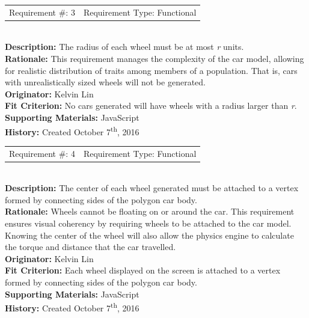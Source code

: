 \documentclass[12pt, titlepage]{article}
\begin{document}
\begin{reqbox}
	\begin{tabular}{cc}
		Requirement \#: 3 & Requirement Type: Functional \\
	\end{tabular} \\
	\textbf{Description:} The radius of each wheel must be at most \textit{r} 
units. 
	\\
	\textbf{Rationale:}  This requirement manages the complexity of the car model, 
	allowing for realistic distribution of traits among members of a population. 
	That is, cars with unrealistically sized wheels will not be generated.\\
	\textbf{Originator:} Kelvin Lin\\
	\textbf{Fit Criterion:} No cars generated will have wheels with a radius larger 
	than \textit{r}.\\
	\textbf{Supporting Materials:} JavaScript \\
	\textbf{History:} Created October 7\textsuperscript{th}, 2016
\end{reqbox}

\newpage

\begin{reqbox}
	\begin{tabular}{cc}
		Requirement \#: 4 & Requirement Type: Functional \\
	\end{tabular} \\
	\textbf{Description:} The center of each wheel generated must be attached to a 
	vertex formed by connecting sides of the polygon car body. \\
	\textbf{Rationale:}  Wheels cannot be floating on or around the car. This 
	requirement ensures visual coherency by requiring wheels to be attached to the 
	car model. Knowing the center of the wheel will also allow the physics engine 
to 
	calculate the torque and distance that the car travelled.\\
	\textbf{Originator:} Kelvin Lin\\
	\textbf{Fit Criterion:} Each wheel displayed on the screen is attached to a 
	vertex formed by connecting sides of the polygon car body.\\
	\textbf{Supporting Materials:} JavaScript \\
	\textbf{History:} Created October 7\textsuperscript{th}, 2016
\end{reqbox}
\end{document}
